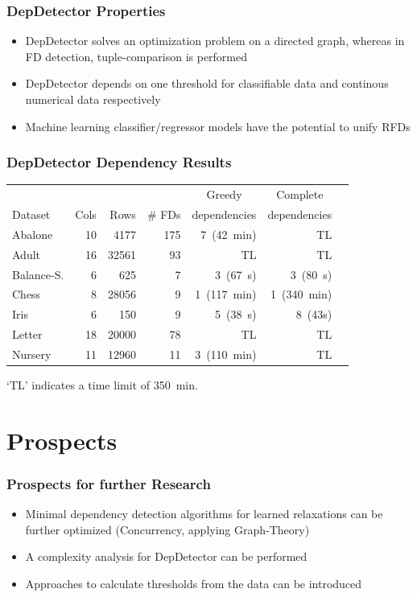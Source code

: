 \documentclass{beamer}
\begin{document}
\begin{frame}
    \frametitle{DepDetector Properties}
    \begin{itemize}
        \item DepDetector solves an optimization problem on a directed graph, whereas in FD detection, tuple-comparison is performed
        \item DepDetector depends on one threshold for classifiable data and continous numerical data respectively
        \item Machine learning classifier/regressor models have the potential to unify RFDs
    \end{itemize}
\end{frame}

\begin{frame}
    \frametitle{DepDetector Dependency Results}
    \begin{table}[ht]
        \centering
        \begin{tabular}{lrrrrrr}
            \toprule
            \toprule
            & & & & \multicolumn{1}{c}{Greedy} & \multicolumn{1}{c}{Complete} \\
            Dataset & Cols & Rows & \# FDs & dependencies & dependencies \\
            \midrule
            Abalone & 10 & 4177 & 175 & 7~(42~min) & TL \\
            Adult & 16 & 32561 & 93 & TL & TL \\
            Balance-S. & 6 & 625 & 7 & 3~(67~s) & 3~(80~s) \\
            Chess & 8 & 28056 & 9 & 1~(117~min) & 1~(340~min) \\
            Iris & 6 & 150 & 9 & 5~(38~s) & 8~(43s) \\
            Letter & 18 & 20000 & 78 & TL & TL \\
            Nursery & 11 & 12960 & 11 & 3~(110~min) & TL \\
            \bottomrule
            \bottomrule
        \end{tabular}
    \end{table}
`TL' indicates a time limit of 350~min.
\end{frame}

\section{Prospects}
\begin{frame}
    \frametitle{Prospects for further Research}
    \begin{itemize}
        \item Minimal dependency detection algorithms for learned relaxations can be further optimized (Concurrency, applying Graph-Theory)
        \item A complexity analysis for DepDetector can be performed
        \item Approaches to calculate thresholds from the data can be introduced
    \end{itemize}
\end{frame}
\end{document}
